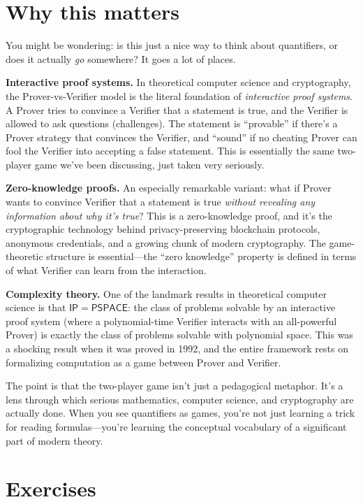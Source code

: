 \documentclass[11pt]{article}
\begin{document}
\section{Why this matters}

You might be wondering: is this just a nice way to think about quantifiers, or does it actually \emph{go} somewhere? It goes a lot of places.

\textbf{Interactive proof systems.} In theoretical computer science and cryptography, the Prover-vs-Verifier model is the literal foundation of \emph{interactive proof systems}. A Prover tries to convince a Verifier that a statement is true, and the Verifier is allowed to ask questions (challenges). The statement is ``provable'' if there's a Prover strategy that convinces the Verifier, and ``sound'' if no cheating Prover can fool the Verifier into accepting a false statement. This is essentially the same two-player game we've been discussing, just taken very seriously.

\textbf{Zero-knowledge proofs.} An especially remarkable variant: what if Prover wants to convince Verifier that a statement is true \emph{without revealing any information about why it's true}? This is a zero-knowledge proof, and it's the cryptographic technology behind privacy-preserving blockchain protocols, anonymous credentials, and a growing chunk of modern cryptography. The game-theoretic structure is essential---the ``zero knowledge'' property is defined in terms of what Verifier can learn from the interaction.

\textbf{Complexity theory.} One of the landmark results in theoretical computer science is that $\mathsf{IP} = \mathsf{PSPACE}$: the class of problems solvable by an interactive proof system (where a polynomial-time Verifier interacts with an all-powerful Prover) is exactly the class of problems solvable with polynomial space. This was a shocking result when it was proved in 1992, and the entire framework rests on formalizing computation as a game between Prover and Verifier.

The point is that the two-player game isn't just a pedagogical metaphor. It's a lens through which serious mathematics, computer science, and cryptography are actually done. When you see quantifiers as games, you're not just learning a trick for reading formulas---you're learning the conceptual vocabulary of a significant part of modern theory.

\section*{Exercises}
\end{document}
